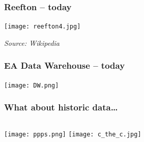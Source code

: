 \documentclass[aspectratio=169]{beamer}
\begin{document}
\frame
{\frametitle{Reefton -- today}
\begin{center}
\texttt{[image: reefton4.jpg]} 
\end{center}
\begin{flushright}
\tiny \emph{Source: Wikipedia}
\end{flushright}
}



\frame
{\frametitle{EA Data Warehouse -- today}
\begin{center}
\texttt{[image: DW.png]} 
\end{center}
}

\frame
{\frametitle{What about historic data\ldots}
\begin{columns}[t]
  \column[T]{5cm}
\texttt{[image: ppps.png]} 
  \column[T]{5cm}
  \vspace{5mm}
  \texttt{[image: c\_the\_c.jpg]}
\end{columns}
}
\end{document}
